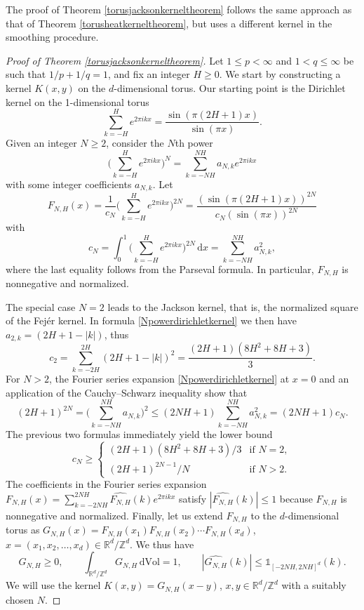 \documentclass[11pt,a4paper]{article}
\theoremstyle{definition}
\begin{document}
The proof of Theorem \ref{torusjacksonkerneltheorem} follows the same approach as that of Theorem \ref{torusheatkerneltheorem}, but uses a different kernel in the smoothing procedure.
\begin{proof}[Proof of Theorem \ref{torusjacksonkerneltheorem}] Let $1 \le p < \infty$ and $1<q \le \infty$ be such that $1/p+1/q=1$, and fix an integer $H \ge 0$. We start by constructing a kernel $K(x,y)$ on the $d$-dimensional torus. Our starting point is the Dirichlet kernel on the 1-dimensional torus
\[ \sum_{k=-H}^H e^{2 \pi i k x} = \frac{\sin (\pi (2H+1)x)}{\sin (\pi x)} . \]
Given an integer $N \ge 2$, consider the $N$th power
\begin{equation}\label{Npowerdirichletkernel}
\bigg( \sum_{k=-H}^H e^{2 \pi i k x} \bigg)^N = \sum_{k=-NH}^{NH} a_{N,k} e^{2 \pi i k x}
\end{equation}
with some integer coefficients $a_{N,k}$. Let
\[ F_{N,H}(x)=\frac{1}{c_N} \bigg( \sum_{k=-H}^H e^{2 \pi i k x} \bigg)^{2N} = \frac{(\sin(\pi (2H+1)x))^{2N}}{c_N (\sin (\pi x))^{2N}} \]
with
\[ c_N = \int_0^1 \bigg( \sum_{k=-H}^H e^{2 \pi i k x} \bigg)^{2N} \, \mathrm{d}x = \sum_{k=-NH}^{NH} a_{N,k}^2 , \]
where the last equality follows from the Parseval formula. In particular, $F_{N,H}$ is nonnegative and normalized.

The special case $N=2$ leads to the Jackson kernel, that is, the normalized square of the Fej\'er kernel. In formula \eqref{Npowerdirichletkernel} we then have $a_{2,k}=(2H+1-|k|)$, thus
\[ c_2 = \sum_{k=-2H}^{2H} (2H+1-|k|)^2 = \frac{(2H+1)(8H^2+8H+3)}{3} . \]
For $N>2$, the Fourier series expansion \eqref{Npowerdirichletkernel} at $x=0$ and an application of the Cauchy--Schwarz inequality show that
\[ (2H+1)^{2N} = \bigg( \sum_{k=-NH}^{NH} a_{N,k} \bigg)^2 \le (2NH+1) \sum_{k=-NH}^{NH} a_{N,k}^2 = (2NH+1) c_N . \]
The previous two formulas immediately yield the lower bound
\begin{equation}\label{cNbound}
c_N \ge \left\{ \begin{array}{ll} (2H+1)(8H^2+8H+3) / 3 & \textrm{if } N=2, \\ (2H+1)^{2N-1} / N & \textrm{if } N>2. \end{array} \right.
\end{equation}
The coefficients in the Fourier series expansion $F_{N,H}(x)=\sum_{k=-2NH}^{2NH} \widehat{F_{N,H}}(k) e^{2 \pi i k x}$ satisfy $|\widehat{F_{N,H}}(k)| \le 1$ because $F_{N,H}$ is nonnegative and normalized. Finally, let us extend $F_{N,H}$ to the $d$-dimensional torus as $G_{N,H}(x)=F_{N,H}(x_1) F_{N,H}(x_2) \cdots F_{N,H}(x_d)$, $x=(x_1, x_2, \ldots, x_d) \in \mathbb{R}^d / \mathbb{Z}^d$. We thus have
\[ G_{N,H} \ge 0, \qquad \int_{\mathbb{R}^d / \mathbb{Z}^d} G_{N,H} \, \mathrm{d}\mathrm{Vol}=1, \qquad |\widehat{G_{N,H}}(k)| \le \mathds{1}_{[-2NH,2NH]^d}(k). \]
We will use the kernel $K(x,y)=G_{N,H}(x-y)$, $x,y \in \mathbb{R}^d / \mathbb{Z}^d$ with a suitably chosen $N$.


\end{proof}
\end{document}
